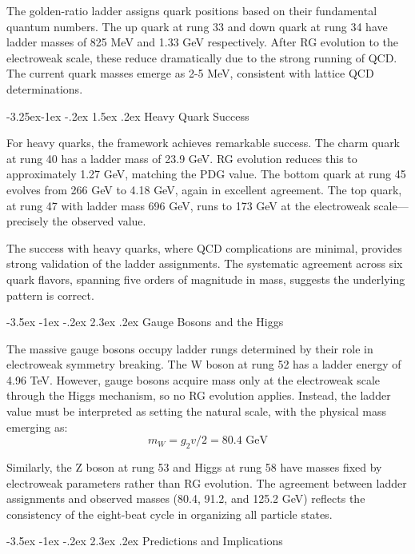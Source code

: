\documentclass[11pt,a4paper]{article}
\makeatletter
\renewcommand\section{\@startsection{section}{1}{\z@}%
  {-3.5ex \@plus -1ex \@minus -.2ex}%
  {2.3ex \@plus.2ex}%
  {\normalfont\Large\bfseries\color{darkblue}}}
\renewcommand\subsection{\@startsection{subsection}{2}{\z@}%
  {-3.25ex\@plus -1ex \@minus -.2ex}%
  {1.5ex \@plus .2ex}%
  {\normalfont\large\bfseries\color{darkblue}}}
\theoremstyle{definition}
\makeatother
\begin{document}
The golden-ratio ladder assigns quark positions based on their fundamental quantum numbers. The up quark at rung 33 and down quark at rung 34 have ladder masses of 825 MeV and 1.33 GeV respectively. After RG evolution to the electroweak scale, these reduce dramatically due to the strong running of QCD. The current quark masses emerge as 2-5 MeV, consistent with lattice QCD determinations.

\subsection{Heavy Quark Success}

For heavy quarks, the framework achieves remarkable success. The charm quark at rung 40 has a ladder mass of 23.9 GeV. RG evolution reduces this to approximately 1.27 GeV, matching the PDG value. The bottom quark at rung 45 evolves from 266 GeV to 4.18 GeV, again in excellent agreement. The top quark, at rung 47 with ladder mass 696 GeV, runs to 173 GeV at the electroweak scale—precisely the observed value.

The success with heavy quarks, where QCD complications are minimal, provides strong validation of the ladder assignments. The systematic agreement across six quark flavors, spanning five orders of magnitude in mass, suggests the underlying pattern is correct.

\section{Gauge Bosons and the Higgs}

The massive gauge bosons occupy ladder rungs determined by their role in electroweak symmetry breaking. The W boson at rung 52 has a ladder energy of 4.96 TeV. However, gauge bosons acquire mass only at the electroweak scale through the Higgs mechanism, so no RG evolution applies. Instead, the ladder value must be interpreted as setting the natural scale, with the physical mass emerging as:
\begin{equation}
m_W = g_2 v/2 = 80.4 \text{ GeV}
\end{equation}

Similarly, the Z boson at rung 53 and Higgs at rung 58 have masses fixed by electroweak parameters rather than RG evolution. The agreement between ladder assignments and observed masses (80.4, 91.2, and 125.2 GeV) reflects the consistency of the eight-beat cycle in organizing all particle states.

\section{Predictions and Implications}
\end{document}
